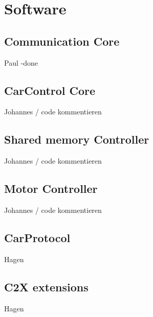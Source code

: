 \chapter{Software}

\section{Communication Core}
Paul -done

\section{CarControl Core}
Johannes / code kommentieren

\section{Shared memory Controller}
Johannes / code kommentieren

\section{Motor Controller}
Johannes / code kommentieren

\section{CarProtocol}
Hagen

\section{C2X extensions}
Hagen
